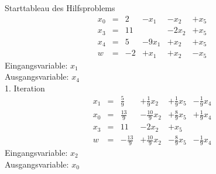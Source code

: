\documentclass[a4paper]{scrartcl}
\begin{document}
\begin{enumerate}
\begin{enumerate}
                Starttableau des Hilfsproblems
                \begin{equation}
                    \begin{array}{rcrrrr}
                        x_0 & = & 2 & -x_1 & -x_2 & +x_5 \\
                        x_3 & = & 11 &  & -2x_2 & +x_5 \\
                        x_4 & = & 5 & -9x_1 & +x_2 & +x_5 \\
                        \hline
                        w   & = & -2 & +x_1 & +x_2 & -x_5
                    \end{array}
                \end{equation}
                Eingangsvariable: $x_1$ \\
                Ausgangsvariable: $x_4$ \\

                1. Iteration
                \begin{equation}
                    \begin{array}{rcrrrr}
                        x_1 & = & \frac{5}{9} & +\frac{1}{9}x_2 & +\frac{1}{9}x_5 & -\frac{1}{9}x_4 \\
                        x_0 & = & \frac{13}{9} & -\frac{10}{9}x_2 & +\frac{8}{9}x_5 & +\frac{1}{9}x_4 \\
                        x_3 & = & 11 & -2x_2 & +x_5 &  \\
                        \hline
                        w   & = & -\frac{13}{9} & +\frac{10}{9}x_2 & -\frac{8}{9}x_5 & -\frac{1}{9}x_4 
                    \end{array}
                \end{equation}
                Eingangsvariable: $x_2$ \\
                Ausgangsvariable: $x_0$ \\


\end{enumerate}
\end{enumerate}
\end{document}

